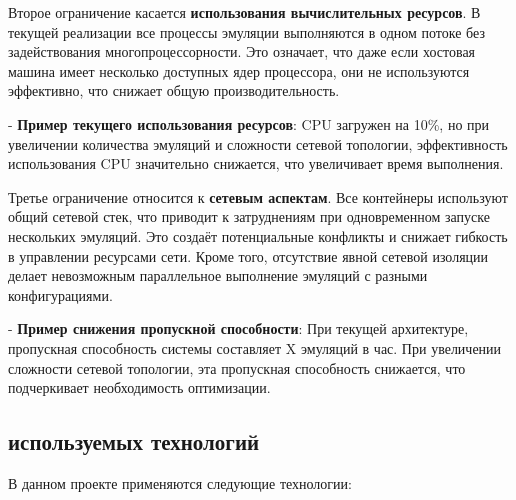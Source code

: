 Второе ограничение касается \textbf{использования вычислительных ресурсов}. В текущей реализации все процессы эмуляции выполняются в одном потоке без задействования многопроцессорности. Это означает, что даже если хостовая машина имеет несколько доступных ядер процессора, они не используются эффективно, что снижает общую производительность.

- \textbf{Пример текущего использования ресурсов}: CPU загружен на 10\%, но при увеличении количества эмуляций и сложности сетевой топологии, эффективность использования CPU значительно снижается, что увеличивает время выполнения.

Третье ограничение относится к \textbf{сетевым аспектам}. Все контейнеры используют общий сетевой стек, что приводит к затруднениям при одновременном запуске нескольких эмуляций. Это создаёт потенциальные конфликты и снижает гибкость в управлении ресурсами сети. Кроме того, отсутствие явной сетевой изоляции делает невозможным параллельное выполнение эмуляций с разными конфигурациями.

- \textbf{Пример снижения пропускной способности}: При текущей архитектуре, пропускная способность системы составляет X эмуляций в час. При увеличении сложности сетевой топологии, эта пропускная способность снижается, что подчеркивает необходимость оптимизации.

\subsection{используемых технологий}

В данном проекте применяются следующие технологии:

